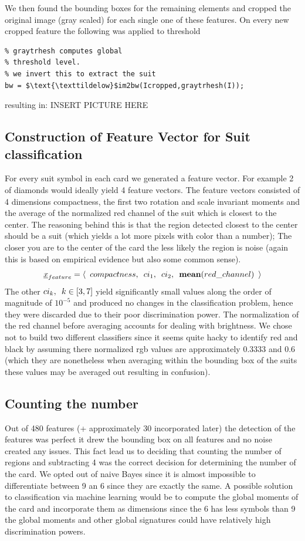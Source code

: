 \documentclass[11pt]{article}
\theoremstyle{plain}
\theoremstyle{definition}
\begin{document}
We then found the bounding boxes for the remaining elements and cropped the original image (gray scaled) for each single one of these features. On every new cropped feature the following was applied to threshold
\begin{lstlisting}[mathescape]
% Inverted global threshold 
% graytrhesh computes global
% threshold level.
% we invert this to extract the suit
bw = $\text{\texttildelow}$im2bw(Icropped,graytrhesh(I));
\end{lstlisting}
resulting in: 
 INSERT PICTURE HERE
\subsection{Construction of Feature Vector for Suit classification}
For every suit symbol in each card we generated a feature vector. For example 2 of diamonds would ideally yield 4 feature vectors. The feature vectors consisted of 4 dimensions compactness, the first two rotation and scale invariant moments and the average of 
the normalized red channel of the suit which is closest to the center. The reasoning behind this is that the region detected closest to the center should be a suit (which yields a lot more pixels with color than a number); The closer you are to the center of the card the less likely the region is noise (again this is based on empirical evidence but also some common sense).
\[
\underline{x}_{feature} = \braket{\enskip compactness, \enskip ci_{1}, \enskip ci_{2}, \enskip \text{\bf mean}(red\_channel) \enskip}
\]
The other $ci_{k}, \enskip k \in [3,7]$ yield significantly small values along the order of magnitude of $10^{-5}$ and produced no changes in the classification problem, hence they were discarded due to their poor discrimination power. The normalization of the red channel before averaging accounts for dealing with brightness. We chose not to build two different classifiers since it seems quite hacky to identify red and black by assuming there normalized rgb values are approximately 0.3333 and 0.6 (which they are nonetheless when averaging within the bounding box of the suits these values may be averaged out resulting in confusion). 
\subsection{Counting the number}
Out of 480 features (+ approximately 30 incorporated later) the detection of the features was perfect it drew the bounding box  on all features and no noise created any issues. This fact lead us to deciding that counting the number of regions and subtracting 4 was the correct decision for determining the number of the card. We opted out of naive Bayes since it is almost impossible to differentiate between 9 an 6 since they are exactly the same. A possible solution to classification via machine learning would be to compute the global moments of the card and incorporate them as dimensions since the 6 has less symbols than 9 the global moments and other global signatures could have relatively high discrimination powers.


\end{document}
